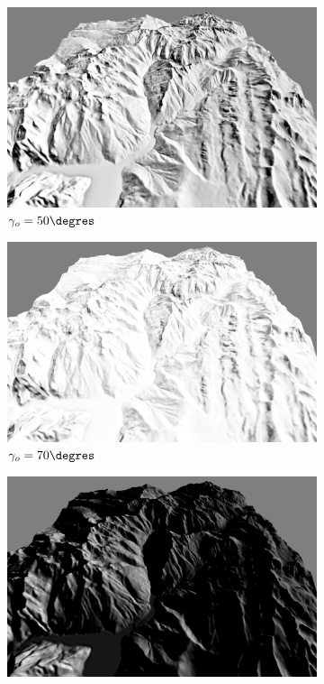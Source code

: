\begin{figure}[h!]
\begin{subfigure}[t]{0.24\linewidth}
   \centering
   \includegraphics[width=1.0\linewidth]{Resultats/3_our_50.png}
   \caption{$\gamma_o = 50\degres$}
 \end{subfigure}
 \begin{subfigure}[t]{0.24\linewidth}
   \centering
   \includegraphics[width=1.0\linewidth]{Resultats/3_our_70.png}
   \caption{$\gamma_o = 70\degres$}
 \end{subfigure}
  \begin{subfigure}[t]{0.24\linewidth}
   \centering
   \includegraphics[width=1.0\linewidth]{Resultats/3_lambert_5.png}

\end{subfigure}
\end{figure}
